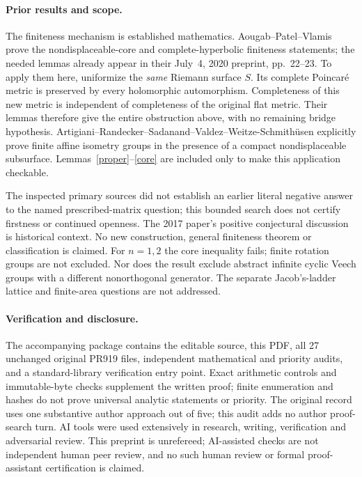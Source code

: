 \documentclass[11pt]{article}
\begin{document}
\paragraph{Prior results and scope.}
The finiteness mechanism is established mathematics. Aougab--Patel--Vlamis \cite[Lemmas~4.1--4.2]{APV} prove the nondisplaceable-core and complete-hyperbolic finiteness statements; the needed lemmas already appear in their July~4, 2020 preprint, pp.~22--23. To apply them here, uniformize the \emph{same} Riemann surface $S$. Its complete Poincar\'e metric is preserved by every holomorphic automorphism. Completeness of this new metric is independent of completeness of the original flat metric. Their lemmas therefore give the entire obstruction above, with no remaining bridge hypothesis. Artigiani--Randecker--Sadanand--Valdez--Weitze-Schmith\"usen \cite[v1, Theorem~1.6; v2, Theorem~1.8]{ARSVW} explicitly prove finite affine isometry groups in the presence of a compact nondisplaceable subsurface. Lemmas~\ref{proper}--\ref{core} are included only to make this application checkable.

The inspected primary sources did not establish an earlier literal negative answer to the named prescribed-matrix question; this bounded search does not certify firstness or continued openness. The 2017 paper's positive conjectural discussion \cite[p.~532]{RMV} is historical context. No new construction, general finiteness theorem or classification is claimed. For $n=1,2$ the core inequality fails; finite rotation groups are not excluded. Nor does the result exclude abstract infinite cyclic Veech groups with a different nonorthogonal generator. The separate Jacob's-ladder lattice and finite-area questions are not addressed.

\paragraph{Verification and disclosure.}
The accompanying package contains the editable source, this PDF, all 27 unchanged original PR919 files, independent mathematical and priority audits, and a standard-library verification entry point. Exact arithmetic controls and immutable-byte checks supplement the written proof; finite enumeration and hashes do not prove universal analytic statements or priority. The original record uses one substantive author approach out of five; this audit adds no author proof-search turn. AI tools were used extensively in research, writing, verification and adversarial review. This preprint is unrefereed; AI-assisted checks are not independent human peer review, and no such human review or formal proof-assistant certification is claimed.
\end{document}
